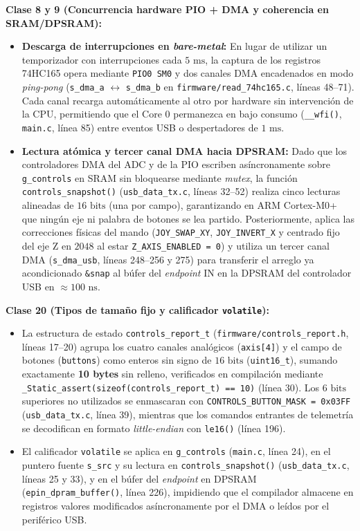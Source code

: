 \textbf{Clase 8 y 9 (Concurrencia hardware PIO + DMA y coherencia en SRAM/DPSRAM):}
\begin{itemize}
	\item \textbf{Descarga de interrupciones en \textit{bare-metal}:} En lugar de utilizar un temporizador con interrupciones cada $5\text{ ms}$, la captura de los registros 74HC165 opera mediante \texttt{PIO0 SM0} y dos canales DMA encadenados en modo \textit{ping-pong} (\texttt{s\_dma\_a} $\leftrightarrow$ \texttt{s\_dma\_b} en \texttt{firmware/read\_74hc165.c}, líneas 48--71). Cada canal recarga automáticamente al otro por hardware sin intervención de la CPU, permitiendo que el Core 0 permanezca en bajo consumo (\texttt{\_\_wfi()}, \texttt{main.c}, línea 85) entre eventos USB o despertadores de $1\text{ ms}$.
	\item \textbf{Lectura atómica y tercer canal DMA hacia DPSRAM:} Dado que los controladores DMA del ADC y de la PIO escriben asíncronamente sobre \texttt{g\_controls} en SRAM sin bloquearse mediante \textit{mutex}, la función \texttt{controls\_snapshot()} (\texttt{usb\_data\_tx.c}, líneas 32--52) realiza cinco lecturas alineadas de $16\text{ bits}$ (una por campo), garantizando en ARM Cortex-M0+ que ningún eje ni palabra de botones se lea partido. Posteriormente, aplica las correcciones físicas del mando (\texttt{JOY\_SWAP\_XY}, \texttt{JOY\_INVERT\_X} y centrado fijo del eje Z en $2048$ al estar \texttt{Z\_AXIS\_ENABLED = 0}) y utiliza un tercer canal DMA (\texttt{s\_dma\_usb}, líneas 248--256 y 275) para transferir el arreglo ya acondicionado \texttt{\&snap} al búfer del \textit{endpoint} IN en la DPSRAM del controlador USB en $\approx 100\text{ ns}$.
\end{itemize}

\textbf{Clase 20 (Tipos de tamaño fijo y calificador \texttt{volatile}):}
\begin{itemize}
	\item La estructura de estado \texttt{controls\_report\_t} (\texttt{firmware/controls\_report.h}, líneas 17--20) agrupa los cuatro canales analógicos (\texttt{axis[4]}) y el campo de botones (\texttt{buttons}) como enteros sin signo de $16\text{ bits}$ (\texttt{uint16\_t}), sumando exactamente \textbf{10 bytes} sin relleno, verificados en compilación mediante \texttt{\_Static\_assert(sizeof(controls\_report\_t) == 10)} (línea 30). Los $6\text{ bits}$ superiores no utilizados se enmascaran con \texttt{CONTROLS\_BUTTON\_MASK = 0x03FF} (\texttt{usb\_data\_tx.c}, línea 39), mientras que los comandos entrantes de telemetría se decodifican en formato \textit{little-endian} con \texttt{le16()} (línea 196).
	\item El calificador \texttt{volatile} se aplica en \texttt{g\_controls} (\texttt{main.c}, línea 24), en el puntero fuente \texttt{s\_src} y su lectura en \texttt{controls\_snapshot()} (\texttt{usb\_data\_tx.c}, líneas 25 y 33), y en el búfer del \textit{endpoint} en DPSRAM (\texttt{epin\_dpram\_buffer()}, línea 226), impidiendo que el compilador almacene en registros valores modificados asíncronamente por el DMA o leídos por el periférico USB.
\end{itemize}

